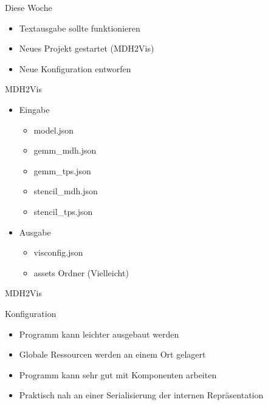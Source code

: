 \documentclass{../presentation}
\begin{document}
\frame[plain]{\titlepage}

\begin{frame}{Diese Woche}
    \begin{itemize}
        \item Textausgabe sollte funktionieren
        \item Neues Projekt gestartet (MDH2Vis)
        \item Neue Konfiguration entworfen
    \end{itemize}
\end{frame}

\begin{frame}{MDH2Vis}
    \begin{itemize}
        \item Eingabe
            \begin{itemize}
                \item model.json
                \item gemm\_mdh.json
                \item gemm\_tps.json
                \item stencil\_mdh.json
                \item stencil\_tps.json
            \end{itemize}
        \item Ausgabe
            \begin{itemize}
                \item visconfig.json
                \item assets Ordner (Vielleicht)
            \end{itemize}
    \end{itemize}
\end{frame}

\begin{frame}{MDH2Vis}
    
\end{frame}

\begin{frame}{Konfiguration}
    \begin{itemize}
        \item Programm kann leichter ausgebaut werden
        \item Globale Ressourcen werden an einem Ort gelagert
        \item Programm kann sehr gut mit Komponenten arbeiten
        \item Praktisch nah an einer Serialisierung der internen Repräsentation
    \end{itemize}
\end{frame}
\end{document}
